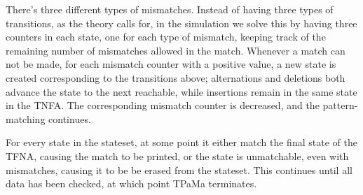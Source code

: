 There's three different types of mismatches. Instead of having three types of transitions, as the theory calls for, in the simulation we solve this by having three counters in each state, one for each type of mismatch, keeping track of the remaining number of mismatches allowed in the match. Whenever a match can not be made, for each mismatch counter with a positive value, a new state is created corresponding to the transitions above; alternations and deletions both advance the state to the next reachable, while insertions remain in the same state in the TNFA. The corresponding mismatch counter is decreased, and the pattern-matching continues.

For every state in the stateset, at some point it either match the final state of the TFNA, causing the match to be printed, or the state is unmatchable, even with mismatches, causing it to be be erased from the stateset. This continues until all data has been checked, at which point TPaMa terminates.